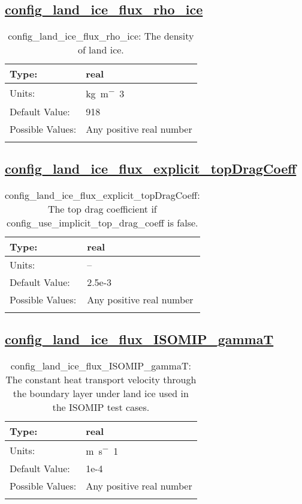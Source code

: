 \subsection[config\_land\_ice\_flux\_rho\_ice]{\hyperref[sec:nm_tab_land_ice_fluxes]{config\_land\_ice\_flux\_rho\_ice}}
\label{subsec:nm_sec_config_land_ice_flux_rho_ice}
\begin{center}
\begin{longtable}{| p{2.0in} || p{4.0in} |}
    \hline
    Type: & real \\
    \hline
    Units: & \si{kg.m^-3} \\
    \hline
    Default Value: & 918 \\
    \hline
    Possible Values: & Any positive real number \\
    \hline
    \caption{config\_land\_ice\_flux\_rho\_ice: The density of land ice.}
\end{longtable}
\end{center}
\subsection[config\_land\_ice\_flux\_explicit\_topDragCoeff]{\hyperref[sec:nm_tab_land_ice_fluxes]{config\_land\_ice\_flux\_explicit\_topDragCoeff}}
\label{subsec:nm_sec_config_land_ice_flux_explicit_topDragCoeff}
\begin{center}
\begin{longtable}{| p{2.0in} || p{4.0in} |}
    \hline
    Type: & real \\
    \hline
    Units: & -- \\
    \hline
    Default Value: & 2.5e-3 \\
    \hline
    Possible Values: & Any positive real number \\
    \hline
    \caption{config\_land\_ice\_flux\_explicit\_topDragCoeff: The top drag coefficient if config\_use\_implicit\_top\_drag\_coeff is false.}
\end{longtable}
\end{center}
\subsection[config\_land\_ice\_flux\_ISOMIP\_gammaT]{\hyperref[sec:nm_tab_land_ice_fluxes]{config\_land\_ice\_flux\_ISOMIP\_gammaT}}
\label{subsec:nm_sec_config_land_ice_flux_ISOMIP_gammaT}
\begin{center}
\begin{longtable}{| p{2.0in} || p{4.0in} |}
    \hline
    Type: & real \\
    \hline
    Units: & \si{m.s^-1} \\
    \hline
    Default Value: & 1e-4 \\
    \hline
    Possible Values: & Any positive real number \\
    \hline
    \caption{config\_land\_ice\_flux\_ISOMIP\_gammaT: The constant heat transport velocity through the boundary layer under land ice used in the ISOMIP test cases.}
\end{longtable}
\end{center}
